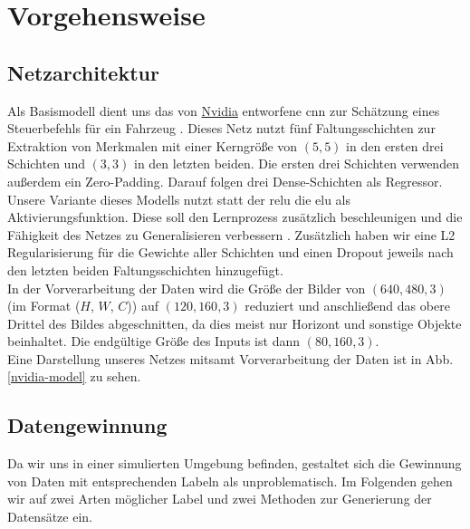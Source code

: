 \chapter{Vorgehensweise}

\section{Netzarchitektur}

Als Basismodell dient uns das von \href{https://www.nvidia.com/en-us/}{Nvidia} entworfene \acs{cnn} zur Schätzung eines Steuerbefehls für ein Fahrzeug \cite{nvidia}. Dieses Netz nutzt fünf Faltungsschichten zur Extraktion von Merkmalen mit einer Kerngröße von $(5, 5)$ in den ersten drei Schichten und $(3, 3)$ in den letzten beiden. Die ersten drei Schichten verwenden außerdem ein Zero-Padding. Darauf folgen drei Dense-Schichten als Regressor. \\

Unsere Variante dieses Modells nutzt statt der \acs{relu} die \acs{elu} als Aktivierungsfunktion. Diese soll den Lernprozess zusätzlich beschleunigen und die Fähigkeit des Netzes zu Generalisieren verbessern \cite{elu}. Zusätzlich haben wir eine L2 Regularisierung für die Gewichte aller Schichten und einen Dropout jeweils nach den letzten beiden Faltungsschichten hinzugefügt. \\

In der Vorverarbeitung der Daten wird die Größe der Bilder von $(640, 480, 3)$ (im Format ($H$, $W$, $C$)) auf $(120, 160, 3)$ reduziert und anschließend das obere Drittel des Bildes abgeschnitten, da dies meist nur Horizont und sonstige Objekte beinhaltet. Die endgültige Größe des Inputs ist dann $(80, 160, 3)$. \\

Eine Darstellung unseres Netzes mitsamt Vorverarbeitung der Daten ist in Abb. \ref{nvidia-model} zu sehen.

\section{Datengewinnung}

Da wir uns in einer simulierten Umgebung befinden, gestaltet sich die Gewinnung von Daten mit entsprechenden Labeln als unproblematisch.
Im Folgenden gehen wir auf zwei Arten möglicher Label und zwei Methoden zur Generierung der Datensätze ein.

